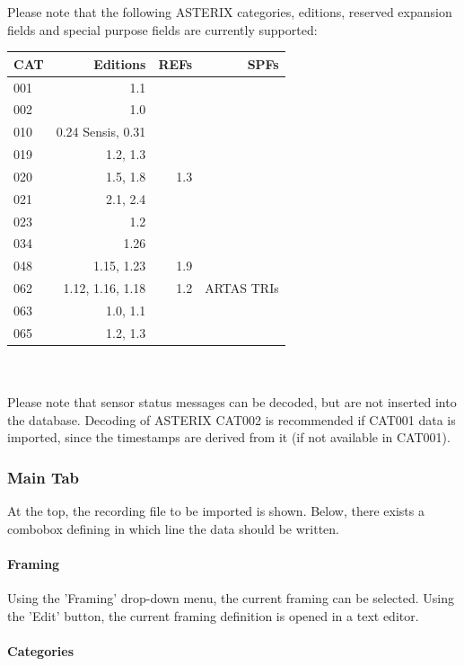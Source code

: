 Please note that the following ASTERIX categories, editions, reserved expansion fields and special purpose fields are currently supported: \\

\begin{tabular}{ | l | r | r | r |}
\hline
  CAT & Editions & REFs & SPFs  \\ \hline
  001 & 1.1 &  &  \\ \hline
  002 & 1.0 &  &  \\ \hline
  010 & 0.24 Sensis, 0.31  &  &  \\ \hline
  019 & 1.2, 1.3 & & \\ \hline
  020 & 1.5, 1.8 & 1.3 & \\ \hline
  021 & 2.1, 2.4 & & \\ \hline
  023 & 1.2 & & \\ \hline
  034 & 1.26 & & \\ \hline
  048 & 1.15, 1.23 & 1.9 & \\ \hline
  062 & 1.12, 1.16, 1.18 & 1.2 & ARTAS TRIs \\ \hline
  063 & 1.0, 1.1 & & \\ \hline
  065 & 1.2, 1.3 & & \\ \hline
\end{tabular} \\
\  \\

Please note that sensor status messages can be decoded, but are not inserted into the database. Decoding of ASTERIX CAT002 is recommended if CAT001 data is imported, since the timestamps are derived from it (if not available in CAT001).

\subsubsection{Main Tab}

At the top, the recording file to be imported is shown. Below, there exists a combobox defining in which line the data should be written. \\

\paragraph{Framing}
Using the 'Framing' drop-down menu, the current framing can be selected. Using the 'Edit' button, the current framing definition is opened in a text editor.

\paragraph{Categories}

